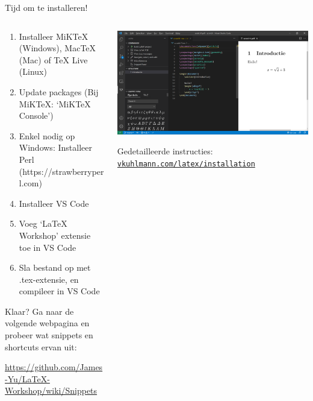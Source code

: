 \begin{frame}{Tijd om te installeren!}
    \begin{columns}
        \begin{column}{0.4\textwidth}
            \tiny
            \begin{enumerate}[label={\arabic*)}]
                \item Installeer MiKTeX (Windows), MacTeX (Mac) of TeX Live (Linux)
                \item Update packages (Bij MiKTeX: `MiKTeX Console')
                \item Enkel nodig op Windows: Installeer Perl (https://strawberryperl.com)
                \item Installeer VS Code
                \item Voeg `LaTeX Workshop' extensie toe in VS Code
                \item Sla bestand op met .tex-extensie, en compileer in VS Code
            \end{enumerate}

            \bigskip

            Klaar? Ga naar de volgende webpagina en probeer wat snippets en
            shortcuts ervan uit:
            
            \url{https://github.com/James-Yu/LaTeX-Workshop/wiki/Snippets}
        \end{column}
        \begin{column}{0.6\textwidth}
            \includegraphics[width=\linewidth,height=0.8\textheight,keepaspectratio]{assets/VisualStudioCodeDemo.png}

            {\tiny
            Gedetailleerde instructies:
            \href{https://vkuhlmann.com/latex/installation}{\nolinkurl{vkuhlmann.com/latex/installation}}}
        \end{column}
    \end{columns}
\end{frame}